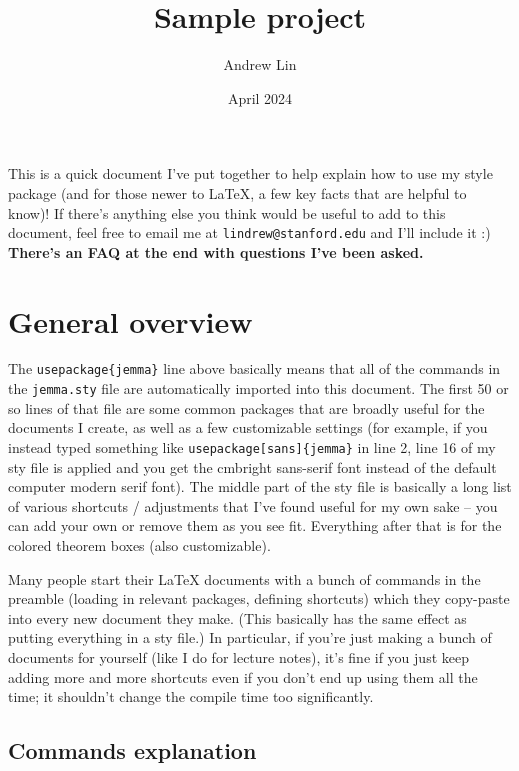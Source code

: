 \documentclass[11pt]{article}
\title{Sample project}
\author{Andrew Lin}
\date{April 2024}
\begin{document}
\maketitle

This is a quick document I've put together to help explain how to use my style package (and for those newer to LaTeX, a few key facts that are helpful to know)! If there's anything else you think would be useful to add to this document, feel free to email me at \texttt{lindrew@stanford.edu} and I'll include it :) \textbf{There's an FAQ at the end with questions I've been asked.}

\section{General overview}

The \texttt{usepackage\{jemma\}} line above basically means that all of the commands in the \texttt{jemma.sty} file are automatically imported into this document. The first 50 or so lines of that file are some common packages that are broadly useful for the documents I create, as well as a few customizable settings (for example, if you instead typed something like \texttt{usepackage[sans]\{jemma\}} in line 2, line 16 of my sty file is applied and you get the cmbright sans-serif font instead of the default computer modern serif font). The middle part of the sty file is basically a long list of various shortcuts / adjustments that I've found useful for my own sake -- you can add your own or remove them as you see fit. Everything after that is for the colored theorem boxes (also customizable).

Many people start their LaTeX documents with a bunch of commands in the preamble (loading in relevant packages, defining shortcuts) which they copy-paste into every new document they make. (This basically has the same effect as putting everything in a sty file.) In particular, if you're just making a bunch of documents for yourself (like I do for lecture notes), it's fine if you just keep adding more and more shortcuts even if you don't end up using them all the time; it shouldn't change the compile time too significantly.

\subsection{Commands explanation}
\end{document}

